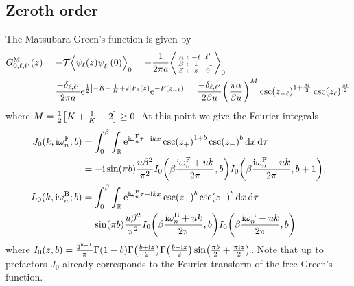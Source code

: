 \documentclass[english, parskip=full]{scrartcl}
\begin{document}
\subsection{Zeroth order}
The Matsubara Green's function is given by
\begin{align}
G_{0,\ell,\ell'}^\M(z) &= -\mathcal{T} \bra*{\psi_\ell(z) \psi_{\ell'}^\dagger(0)}_0 = -\frac{1}{2\pi a} \bra*{\zabx{-\ell & \ell'}{1 & -1}{z & 0}}_0\\
&= \frac{-\delta_{\ell,\ell'}}{2\pi a} \powe{\frac{1}{2}\klb*{-K - \frac{1}{K} + 2}F_1(z)} \powe{-F\kla*{z_{-\ell}}} = \frac{-\delta_{\ell,\ell'}}{2\beta u} \kla*{\frac{\pi\alpha}{\beta u}}^M \csc(z_{-\ell})^{1 + \frac{M}{2}} \csc(z_\ell)^\frac{M}{2}
\end{align}
where $M=\frac{1}{2} \klb*{K + \frac{1}{K} - 2} \ge 0$.
At this point we give the Fourier integrals
\begin{align}
J_0(k,\i\omega_n^\F; b) &= \intx{0}{\beta}{\intr{\powe{\i \omega_n^\F\tau - \i kx} \csc(z_+)^{1+b} \csc(z_-)^b}{x} }{\tau}\\
&= -\i\sin(\pi b) \frac{u\beta^2}{\pi^2} I_0\kla*{\beta\frac{\i\omega_n^\F + uk}{2\pi}, b} I_0\kla*{\beta\frac{\i\omega_n^\F - uk}{2\pi}, b+1},\\
L_0(k,\i\omega_n^\B; b) &= \intx{0}{\beta}{\intr{\powe{\i \omega_n^\B \tau - \i kx} \csc(z_+)^{b} \csc(z_-)^b}{x} }{\tau}\\
&= \sin(\pi b) \frac{u\beta^2}{\pi^2} I_0\kla*{\beta\frac{\i\omega_n^\B + uk}{2\pi}, b} I_0\kla*{\beta\frac{\i\omega_n^\B - uk}{2\pi}, b}
\end{align}
where $I_0(z,b) = \frac{2^{b-1}}{\pi} \Gamma(1-b) \Gamma\kla*{\frac{b+\i z}{2}} \Gamma\kla*{\frac{b-\i z}{2}} \sin\kla*{\frac{\pi b}{2} + \frac{\pi\i z}{2}}$.
Note that up to prefactors $J_0$ already corresponds to the Fourier transform of the free Green's function.
\end{document}
